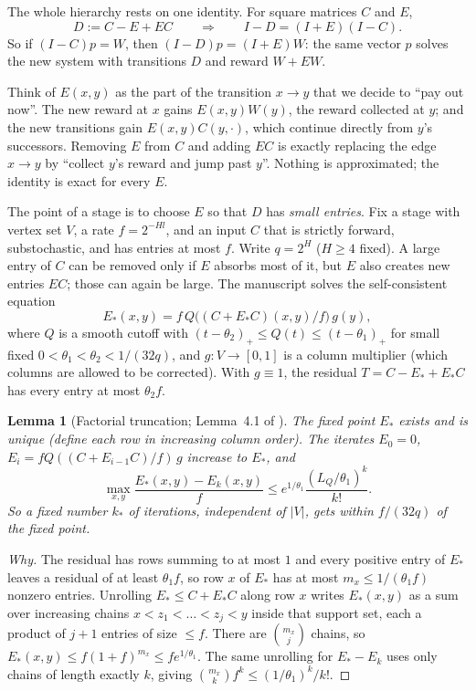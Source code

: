 \documentclass[11pt]{article}
\newtheorem{lemma}[theorem]{Lemma}
\theoremstyle{definition}
\theoremstyle{remark}
\newcommand{\abs}[1]{\lvert #1\rvert}
\begin{document}
The whole hierarchy rests on one identity. For square matrices $C$ and $E$,
\[
D:=C-E+EC\qquad\Longrightarrow\qquad I-D=(I+E)(I-C).
\]
So if $(I-C)p=W$, then $(I-D)p=(I+E)W$: the same vector $p$ solves the new system
with transitions $D$ and reward $W+EW$.

\begin{idea}
Think of $E(x,y)$ as the part of the transition $x\to y$ that we decide to
``pay out now''. The new reward at $x$ gains $E(x,y)W(y)$, the reward collected
at $y$; and the new transitions gain $E(x,y)C(y,\cdot)$, which continue directly
from $y$'s successors. Removing $E$ from $C$ and adding $EC$ is exactly replacing
the edge $x\to y$ by ``collect $y$'s reward and jump past $y$''. Nothing is
approximated; the identity is exact for every $E$.
\end{idea}

The point of a stage is to choose $E$ so that $D$ has \emph{small entries}. Fix a
stage with vertex set $V$, a rate $f=2^{-Hl}$, and an input $C$ that is strictly
forward, substochastic, and has entries at most $f$. Write $q=2^H$ ($H\ge4$ fixed).
A large entry of $C$ can be removed only if $E$ absorbs most of it, but $E$ also
creates new entries $EC$; those can again be large. The manuscript solves the
self-consistent equation
\[
E_*(x,y)=f\,Q\bigl((C+E_*C)(x,y)/f\bigr)\,g(y),
\]
where $Q$ is a smooth cutoff with $(t-\theta_2)_+\le Q(t)\le(t-\theta_1)_+$ for small
fixed $0<\theta_1<\theta_2<1/(32q)$, and $g\colon V\to[0,1]$ is a column multiplier
(which columns are allowed to be corrected). With $g\equiv1$, the residual
$T=C-E_*+E_*C$ has every entry at most $\theta_2f$.

\begin{lemma}[Factorial truncation; Lemma~4.1 of \cite{OpenAI-BPL}]\label{lem:factorial}
The fixed point $E_*$ exists and is unique (define each row in increasing column
order). The iterates $E_0=0$, $E_i=fQ((C+E_{i-1}C)/f)\,g$ increase to $E_*$, and
\[
\max_{x,y}\frac{E_*(x,y)-E_k(x,y)}f\le e^{1/\theta_1}\frac{(L_Q/\theta_1)^k}{k!}.
\]
So a fixed number $k_*$ of iterations, independent of $\abs V$, gets within
$f/(32q)$ of the fixed point.
\end{lemma}

\begin{proof}[Why]
The residual has rows summing to at most $1$ and every positive entry of $E_*$
leaves a residual of at least $\theta_1f$, so row $x$ of $E_*$ has at most
$m_x\le1/(\theta_1f)$ nonzero entries. Unrolling $E_*\le C+E_*C$ along row $x$
writes $E_*(x,y)$ as a sum over increasing chains $x<z_1<\dots<z_j<y$ inside
that support set, each a product of $j+1$ entries of size $\le f$. There are
$\binom{m_x}{j}$ chains, so $E_*(x,y)\le f(1+f)^{m_x}\le fe^{1/\theta_1}$. The
same unrolling for $E_*-E_k$ uses only chains of length exactly $k$, giving
$\binom{m_x}{k}f^k\le(1/\theta_1)^k/k!$.
\end{proof}
\end{document}
